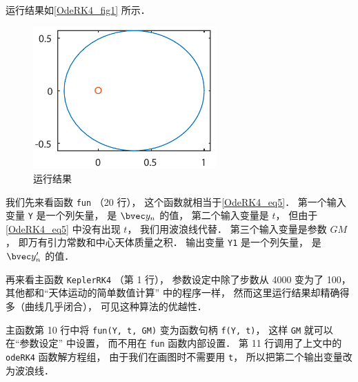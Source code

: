运行结果如\autoref{OdeRK4_fig1} 所示．

\begin{figure}[ht]
\centering
\includegraphics[width=7cm]{./figures/OdeRK4_1.pdf}
\caption{运行结果} \label{OdeRK4_fig1}
\end{figure}

我们先来看函数 \lstinline|fun| （20 行）， 这个函数就相当于\autoref{OdeRK4_eq5}． 第一个输入变量 \lstinline|Y| 是一个列矢量， 是 $\bvec y_n$ 的值， 第二个输入变量是 $t$， 但由于\autoref{OdeRK4_eq5} 中没有出现 $t$， 我们用波浪线代替． 第三个输入变量是参数 $GM$， 即万有引力常数和中心天体质量之积． 输出变量 \lstinline|Y1| 是一个列矢量， 是 $\bvec y'_n$ 的值．

再来看主函数 \lstinline|KeplerRK4| （第 1 行）， 参数设定中除了步数从 4000 变为了 100， 其他都和“天体运动的简单数值计算” 中的程序一样， 然而这里运行结果却精确得多（曲线几乎闭合）， 可见这种算法的优越性．

主函数第 10 行中将 \lstinline|fun(Y, t, GM)| 变为函数句柄 \lstinline|f(Y, t)|， 这样 \lstinline|GM| 就可以在“参数设定” 中设置， 而不用在 \lstinline|fun| 函数内部设置． 第 11 行调用了上文中的 \lstinline|odeRK4| 函数解方程组， 由于我们在画图时不需要用 \lstinline|t|， 所以把第二个输出变量改为波浪线．

